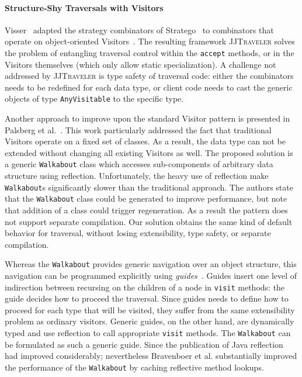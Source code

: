 \paragraph{Structure-Shy Traversals with Visitors}
Visser~\cite{visser01visitor} adapted the strategy combinators of Stratego~\cite{visser1998core,Visser:1998:BPO:289423.289425} to combinators that operate on object-oriented Visitors~\cite{gof}.
The resulting framework \textsc{JJTraveler} solves the problem of entangling traversal control within the \lstinline{accept} methods, or in the Visitors themselves (which only allow static specialization).
A challenge not addressed by \textsc{JJTraveler} is type safety of traversal code: either the combinators needs to be redefined for each data type, or client code needs to cast the generic objects of type \lstinline{AnyVisitable} to the specific type. 

Another approach to improve upon the standard Visitor pattern is presented in Palsberg et al.~\cite{palsberg98essence}.
This work particularly addressed the fact that traditional Visitors operate on a fixed set of classes. As a result, the data type can not be extended without changing all existing Visitors as well.
The proposed solution is a generic \lstinline{Walkabout} class which accesses sub-components of arbitrary data structure using reflection.
Unfortunately, the heavy use of reflection make \lstinline{Walkabout}s significantly slower than the traditional approach.
The authors  state that the \lstinline{Walkabout} class could be generated to improve performance, but note that addition of a class could trigger regeneration. As a result the pattern does not support separate compilation.
Our solution obtains the same kind of default behavior for traversal,  without losing extensibility, type safety, or separate compilation.

Whereas the \lstinline{Walkabout} provides generic navigation over an object structure, this navigation can be programmed explicitly using \textit{guides}~\cite{bravenboer2001guiding}.
Guides insert one level of indirection between recursing on the children of a node in \lstinline{visit} methods: the guide decides how to proceed the traversal.
Since guides needs to define how to proceed for each type that will be visited, they suffer from the same extensibility problem
as ordinary visitors.
Generic guides, on the other hand, are dynamically typed and use reflection to call appropriate \lstinline{visit} methods.
The \lstinline{Walkabout} can be formulated as such a generic guide.
Since the publication of \cite{palsberg98essence} Java reflection had improved considerably; nevertheless Bravenboer et al. substantially improved the performance of the \lstinline{Walkabout} by caching reflective method lookups.




